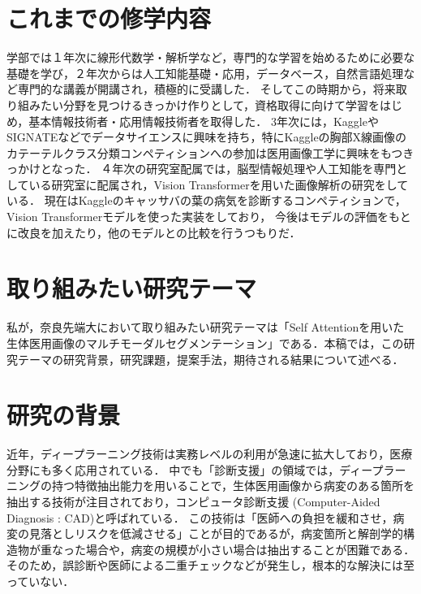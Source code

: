 \documentclass[a4j,10pt,twocolumn]{jarticle}
\begin{document}
\section{これまでの修学内容}
学部では１年次に線形代数学・解析学など，専門的な学習を始めるために必要な基礎を学び，２年次からは人工知能基礎・応用，データベース，自然言語処理など専門的な講義が開講され，積極的に受講した．
そしてこの時期から，将来取り組みたい分野を見つけるきっかけ作りとして，資格取得に向けて学習をはじめ，基本情報技術者・応用情報技術者を取得した．
3年次には，KaggleやSIGNATEなどでデータサイエンスに興味を持ち，特にKaggleの胸部X線画像のカテーテルクラス分類コンペティションへの参加は医用画像工学に興味をもつきっかけとなった．
４年次の研究室配属では，脳型情報処理や人工知能を専門としている研究室に配属され，Vision Transformerを用いた画像解析の研究をしている．
現在はKaggleのキャッサバの葉の病気を診断するコンペティションで，Vision Transformerモデルを使った実装をしており，
今後はモデルの評価をもとに改良を加えたり，他のモデルとの比較を行うつもりだ．

\section{取り組みたい研究テーマ}
私が，奈良先端大において取り組みたい研究テーマは「Self Attentionを用いた生体医用画像のマルチモーダルセグメンテーション」である．本稿では，この研究テーマの研究背景，研究課題，提案手法，期待される結果について述べる．

\section{研究の背景}
近年，ディープラーニング技術は実務レベルの利用が急速に拡大しており，医療分野にも多く応用されている．
中でも「診断支援」の領域では，ディープラーニングの持つ特徴抽出能力を用いることで，生体医用画像から病変のある箇所を抽出する技術が注目されており，コンピュータ診断支援 (Computer-Aided Diagnosis : CAD)と呼ばれている． 
この技術は「医師への負担を緩和させ，病変の見落としリスクを低減させる」ことが目的であるが，病変箇所と解剖学的構造物が重なった場合や，病変の規模が小さい場合は抽出することが困難である．
そのため，誤診断や医師による二重チェックなどが発生し，根本的な解決には至っていない．
\end{document}
